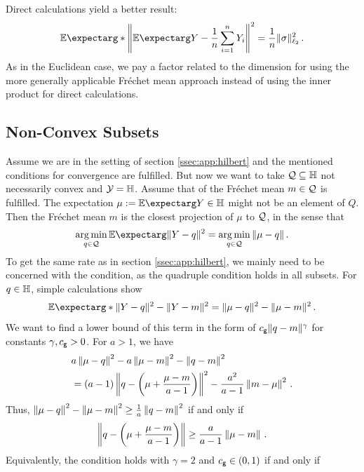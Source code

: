 	Direct calculations yield a better result:
	\begin{equation*}
		\Ex*{\normOf{\Ex{Y}-\frac1n\sum_{i=1}^nY_i}^2} 
		=
		\frac1n \normof{\sigma}_{\ell_2}^2
		\eqfs
	\end{equation*}
	As in the Euclidean case, we pay a factor related to the dimension for using the more generally applicable Fréchet mean approach instead of using the inner product for direct calculations.
%
%
\subsection{Non-Convex Subsets}\label{ssec:app:nonconvex}
%
	Assume we are in the setting of section \ref{ssec:app:hilbert} and the mentioned conditions for convergence are fulfilled.
	But now we want to take $\mathcal{Q} \subseteq \mathbb{H}$ not necessarily convex and $\mathcal{Y} = \mathbb{H}$. Assume that  of the Fréchet mean $m\in\mathcal{Q}$ is fulfilled. The expectation $\mu := \Ex{Y} \in \mb H$ might not be an element of $Q$. Then the Fréchet mean $m$ is the closest projection of $\mu$ to $\mathcal{Q}$, in the sense that
	\begin{align*}
		\argmin_{q\in\mc Q} \Ex{\normof{Y-q}^2} 
		= 
		\argmin_{q\in\mc Q} \normof{\mu-q}
		\eqfs
	\end{align*}
	To get the same rate as in section \ref{ssec:app:hilbert}, we mainly need to be concerned with the  condition, as the quadruple condition holds in all subsets.
	For $q\in\mathbb{H}$, simple calculations show
	\begin{align*}
		\Ex*{\normof{Y-q}^2-\normof{Y-m}^2} 
		=
		\normof{\mu-q}^2-\normof{\mu-m}^2
		\eqfs
	\end{align*}
	We want to find a lower bound of this term in the form of $c_{\mathsf{g}} \Vert q-m \Vert^\gamma$ for constants $\gamma, c_{\mathsf{g}} > 0$.
	For $a>1$, we have
	\begin{align*}
		&a\left\Vert \mu-q \right\Vert^2-a\left\Vert \mu-m \right\Vert^2 - \left\Vert q-m \right\Vert^2 
		\\&= (a-1)\left\Vert q-\left( \mu+\frac{\mu-m}{a-1} \right) \right\Vert^2 - \frac{a^2}{a-1} \left\Vert m-\mu \right\Vert^2
		\, .
	\end{align*}
	Thus, $\left\Vert \mu-q \right\Vert^2-\left\Vert \mu-m \right\Vert^2 \geq \frac1a\left\Vert q-m \right\Vert^2$ if and only if 
	\begin{equation*}
		\left\Vert q-\left( \mu+\frac{\mu-m}{a-1} \right) \right\Vert \geq \frac{a}{a-1} \left\Vert \mu-m \right\Vert
		\, .
	\end{equation*}
	Equivalently, the  condition holds with $\gamma=2$ and $c_{\mathsf{g}} \in (0,1)$ if and only if

